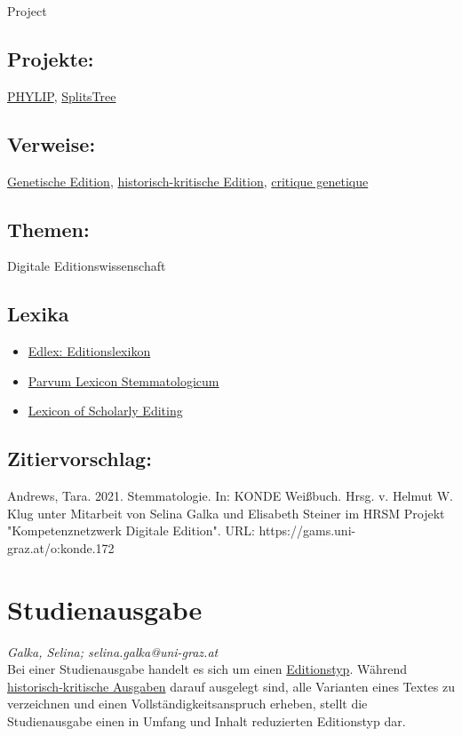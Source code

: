 \documentclass{article}
\begin{document}
{                           Project}\subsection*{Projekte:}\href{https://evolution.genetics.washington.edu/phylip.html}{PHYLIP}, \href{http://www.splitstree.org}{SplitsTree}\subsection*{Verweise:}\href{https://gams.uni-graz.at/o:konde.90}{Genetische Edition}, \href{https://gams.uni-graz.at/o:konde.93}{historisch-kritische Edition}, \href{https://gams.uni-graz.at/o:konde.46}{critique genetique}\subsection*{Themen:}Digitale Editionswissenschaft\subsection*{Lexika}\begin{itemize}\item \href{https://edlex.de/index.php?title=Stemma}{Edlex: Editionslexikon}\item \href{https://wiki.helsinki.fi/display/stemmatology/Stemmatology}{Parvum Lexicon Stemmatologicum}\item \href{https://lexiconse.uantwerpen.be/index.php/lexicon/stemmatology/}{Lexicon of Scholarly Editing}\end{itemize}\subsection*{Zitiervorschlag:}Andrews, Tara. 2021. Stemmatologie. In: KONDE Weißbuch. Hrsg. v. Helmut W. Klug unter Mitarbeit von Selina Galka und Elisabeth Steiner im HRSM Projekt "Kompetenznetzwerk Digitale Edition". URL: https://gams.uni-graz.at/o:konde.172\newpage\section*{Studienausgabe} \emph{Galka, Selina; selina.galka@uni-graz.at }\\
        
    Bei einer Studienausgabe handelt es sich um einen \href{http://gams.uni-graz.at/o:konde.76}{Editionstyp}. Während \href{http://gams.uni-graz.at/o:konde.93}{historisch-kritische Ausgaben} darauf ausgelegt sind, alle Varianten eines Textes zu verzeichnen und einen Vollständigkeitsanspruch erheben, stellt die Studienausgabe einen in Umfang und Inhalt reduzierten Editionstyp dar.\\
            
\end{document}
